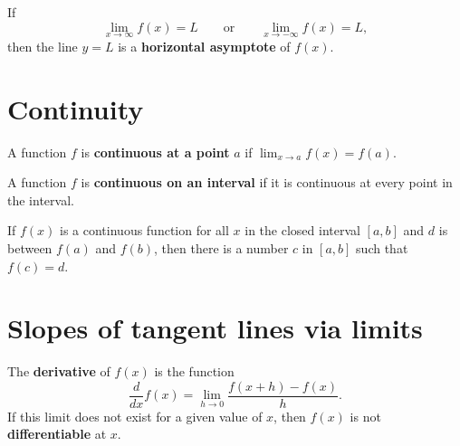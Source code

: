 \documentclass{ximera}
\newcommand{\ddx}{\frac{d}{dx}}
\begin{document}
\begin{definition}
If
\[
\lim_{x\to \infty} f(x) = L \qquad\text{or}\qquad \lim_{x\to -\infty} f(x) = L,
\]
then the line $y=L$ is a \textbf{horizontal asymptote} of $f(x)$.
\end{definition}







\section{Continuity}






\begin{definition}
A function $f$ is \textbf{continuous at a point} $a$ if $\lim_{x\to a}
f(x) = f(a)$.
\end{definition}




\begin{definition}
A function $f$ is \textbf{continuous on an interval} if it is
continuous at every point in the interval.
\end{definition}




\begin{theorem}
If $f(x)$ is a continuous function for all $x$ in the closed interval
$[a,b]$ and $d$ is between $f(a)$ and $f(b)$, then there is a number
$c$ in $[a, b]$ such that $f(c) = d$.
\end{theorem}







\section{Slopes of tangent lines via limits}







\begin{definition}
The \textbf{derivative} of $f(x)$ is the function
\[
\ddx f(x) = \lim_{h\to 0} \frac{f(x+h) - f(x)}{h}.
\]
If this limit does not exist for a given value of $x$, then $f(x)$ is
not \textbf{differentiable} at $x$.
\end{definition}
\end{document}
